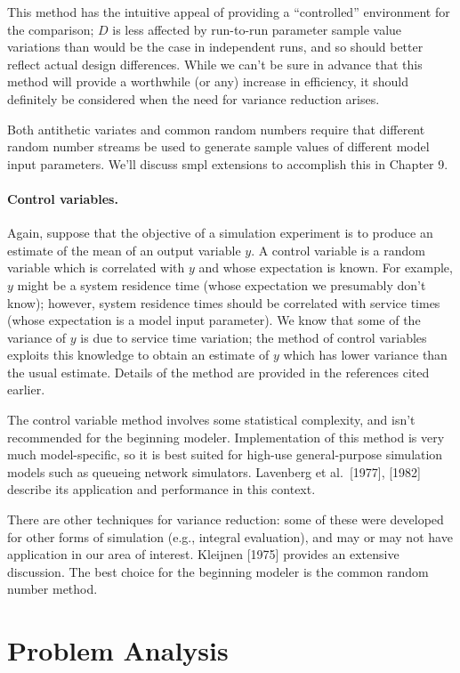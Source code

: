 This method has the intuitive appeal of providing a ``controlled''
environment for the comparison; $D$ is less affected by run-to-run parameter
sample value variations than would be the case in independent runs, and so
should better reflect actual design differences. While we can't be sure in
advance that this method will provide a worthwhile (or any) increase in
efficiency, it should definitely be considered when the need for variance
reduction arises.

Both antithetic variates and common random numbers require that different
random number streams be used to generate sample values of different model
input parameters. We'll discuss smpl extensions to accomplish this in
Chapter 9.


\paragraph{Control variables.}
Again, suppose that the objective of a simulation experiment is to produce an
estimate of the mean of an output variable $y$. A control variable is a random
variable which is correlated with $y$ and whose expectation is known. For
example, $y$ might be a system residence time (whose expectation we presumably
don't know); however, system residence times should be correlated with service
times (whose expectation is a model input parameter). We know that some of the
variance of $y$ is due to service time variation; the method of control
variables exploits this knowledge to obtain an estimate of $y$ which has lower
variance than the usual estimate. Details of the method are provided in the
references cited earlier.

The control variable method involves some statistical complexity, and isn't
recommended for the beginning modeler. Implementation of this method is very
much model-specific, so it is best suited for high-use general-purpose
simulation models such as queueing network simulators. Lavenberg et al.\ [1977],
[1982] describe its application and performance in this context.

There are other techniques for variance reduction: some of these were
developed for other forms of simulation (e.g., integral evaluation), and may
or may not have application in our area of interest. Kleijnen [1975] provides
an extensive discussion. The best choice for the beginning modeler is the
common random number method.

\section{Problem Analysis}
\label{sec:problem-analysis}

